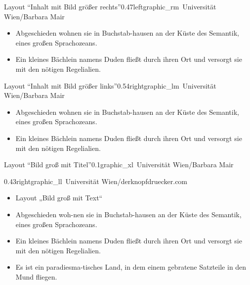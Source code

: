 \documentclass[hyperref={pdfpagelabels=false}, aspectratio=169, t]{beamer}  %
\begin{document}
\begin{graphicsFrame}{Layout ``Inhalt mit Bild größer rechts''}{}{0.47}{left}{graphic_rm}{\textcopyright~Universität Wien/Barbara Mair}

		\begin{itemize}
			\item Abgeschieden wohnen sie in Buchstab-hausen an der Küste des Semantik, eines großen Sprachozeans.
			\item Ein kleines Bächlein namens Duden fließt durch ihren Ort und versorgt sie mit den nötigen Regelialien.
		\end{itemize}

\end{graphicsFrame}

\begin{graphicsFrame}{Layout ``Inhalt mit Bild größer links''}{}{0.54}{right}{graphic_lm}{\textcopyright~Universität Wien/Barbara Mair}

		\begin{itemize}
			\item Abgeschieden wohnen sie in Buchstab-hausen an der Küste des Semantik, eines großen Sprachozeans.
			\item Ein kleines Bächlein namens Duden fließt durch ihren Ort und versorgt sie mit den nötigen Regelialien.
		\end{itemize}

\end{graphicsFrame}

\begin{graphicsFrame}{Layout ``Bild groß mit Titel''}{}{0.1}{}{graphic_xl}{\textcopyright~Universität Wien/Barbara Mair}

\end{graphicsFrame}

\begin{graphicsFrame}{}{}{0.43}{right}{graphic_ll}{\textcopyright~Universität Wien/derknopfdruecker.com}

		\begin{itemize}
			\item Layout „Bild groß mit Text“ 
			\item Abgeschieden woh-nen sie in Buchstab-hausen an der Küste des Semantik, eines großen Sprachozeans.
			\item Ein kleines Bächlein namens Duden fließt durch ihren Ort und versorgt sie mit den nötigen Regelialien.
			\item Es ist ein paradiesma-tisches Land, in dem einem gebratene Satzteile in den Mund fliegen.
		\end{itemize}

\end{graphicsFrame}
\end{document}
